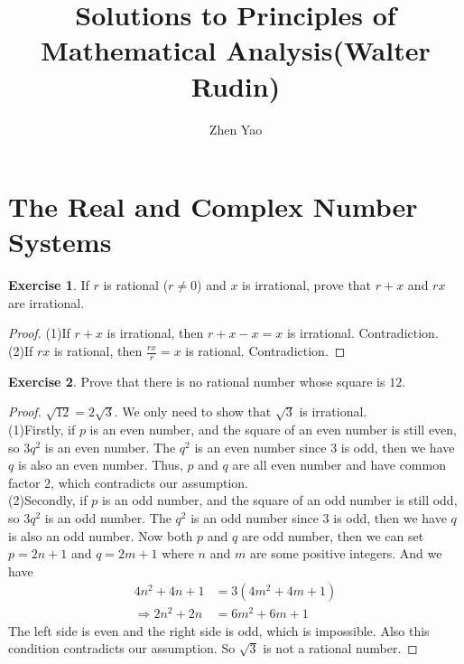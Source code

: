 \documentclass[12pt]{extarticle}
\title{\textbf{\LARGE Solutions to Principles of Mathematical Analysis(Walter Rudin)}}
\author{\Large Zhen Yao}
\date{}
\newcommand{\<}{\langle}
\renewcommand{\>}{\rangle}
\theoremstyle{definition}
\newtheorem{exercise}{Exercise}
\begin{document}
\maketitle

\section{The Real and Complex Number Systems}
\begin{exercise}\label{ex1}
If $r$ is rational ($r \neq 0$) and $x$ is irrational, prove that $r+x$ and $rx$ are irrational.
\end{exercise}
\begin{proof}
(1)If $r+x$ is irrational, then $r+x-x=x$ is irrational. Contradiction. \\
\hspace*{3em}(2)If $rx$ is rational, then $\frac{rx}{r} = x$ is rational. Contradiction.
\end{proof}

\medskip

\begin{exercise}\label{ex2}
Prove that there is no rational number whose square is $12$.
\end{exercise}
\begin{proof}
$\sqrt{12} = 2 \sqrt{3}$. We only need to show that $\sqrt{3}$ is irrational. \\
(1)Firstly, if $p$ is an even number, and the square of an even number is still even, so $3q^2$ is an even number. The $q^2$ is an even number since $3$ is odd, then we have $q$ is also an even number. Thus, $p$ and $q$ are all even number and have common factor $2$, which contradicts our assumption. \\
(2)Secondly, if $p$ is an odd number, and the square of an odd number is still odd, so $3q^2$ is an odd number. The $q^2$ is an odd number since $3$ is odd, then we have $q$ is also an odd number. Now both $p$ and $q$ are odd number, then we can set $p = 2n + 1$ and $q = 2m + 1$ where $n$ and $m$ are some positive integers. And we have
\begin{align*}
    4n^2 + 4n + 1 &= 3(4m^2 + 4m + 1) \\
    \Rightarrow 2n^2 + 2n &= 6m^2 + 6m + 1
\end{align*}
The left side is even and the right side is odd, which is impossible. Also this condition contradicts our assumption. So $\sqrt{3}$ is not a rational number.
\end{proof}
\end{document}
